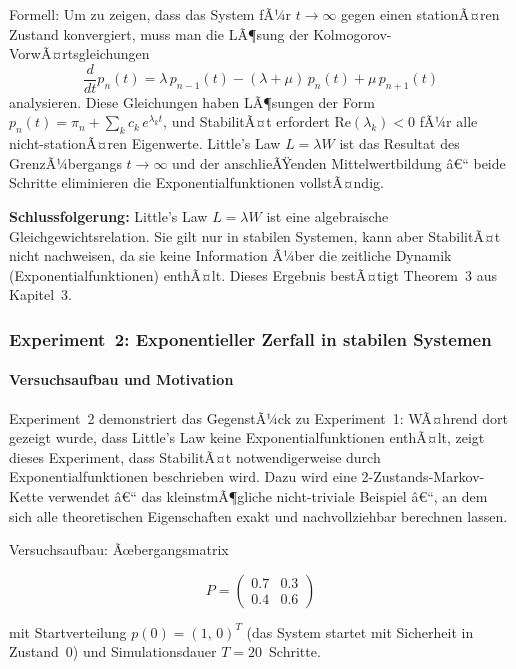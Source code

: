 ﻿\documentclass[a4paper,12pt]{scrreprt}
\theoremstyle{definition}
\begin{document}
Formell: Um zu zeigen, dass das System fÃ¼r $t \to \infty$ gegen einen
stationÃ¤ren Zustand konvergiert, muss man die LÃ¶sung der
Kolmogorov-VorwÃ¤rtsgleichungen
\[
\frac{d}{dt}p_n(t) = \lambda\, p_{n-1}(t) - (\lambda+\mu)\,p_n(t)
+ \mu\, p_{n+1}(t)
\]
analysieren.  Diese Gleichungen haben LÃ¶sungen der Form
$p_n(t) = \pi_n + \sum_k c_k\, e^{\lambda_k t}$, und StabilitÃ¤t
erfordert $\text{Re}(\lambda_k) < 0$ fÃ¼r alle nicht-stationÃ¤ren
Eigenwerte.  Little's Law $L = \lambda W$ ist das Resultat des
GrenzÃ¼bergangs $t \to \infty$ und der anschlieÃŸenden
Mittelwertbildung â€“ beide Schritte eliminieren die
Exponentialfunktionen vollstÃ¤ndig.

\textbf{Schlussfolgerung:} Little's Law $L = \lambda W$ ist eine
algebraische Gleichgewichtsrelation.  Sie gilt nur in stabilen
Systemen, kann aber StabilitÃ¤t nicht nachweisen, da sie keine
Information Ã¼ber die zeitliche Dynamik (Exponentialfunktionen)
enthÃ¤lt.  Dieses Ergebnis bestÃ¤tigt Theorem~3 aus Kapitel~3.

\subsubsection{Experiment~2: Exponentieller Zerfall in stabilen Systemen}
\label{subsubsec:exp2}

\paragraph{Versuchsaufbau und Motivation}

Experiment~2 demonstriert das GegenstÃ¼ck zu Experiment~1: WÃ¤hrend
dort gezeigt wurde, dass Little's Law keine Exponentialfunktionen
enthÃ¤lt, zeigt dieses Experiment, dass StabilitÃ¤t notwendigerweise
durch Exponentialfunktionen beschrieben wird.  Dazu wird eine
2-Zustands-Markov-Kette verwendet â€“ das kleinstmÃ¶gliche nicht-triviale
Beispiel â€“, an dem sich alle theoretischen Eigenschaften exakt und
nachvollziehbar berechnen lassen.

Versuchsaufbau: Ãœbergangsmatrix

\begin{equation}
	P = \begin{pmatrix} 0.7 & 0.3 \\ 0.4 & 0.6 \end{pmatrix}
\end{equation}

mit Startverteilung $p(0) = (1,\, 0)^T$ (das System startet mit
Sicherheit in Zustand~0) und Simulationsdauer $T = 20$~Schritte.
\end{document}
